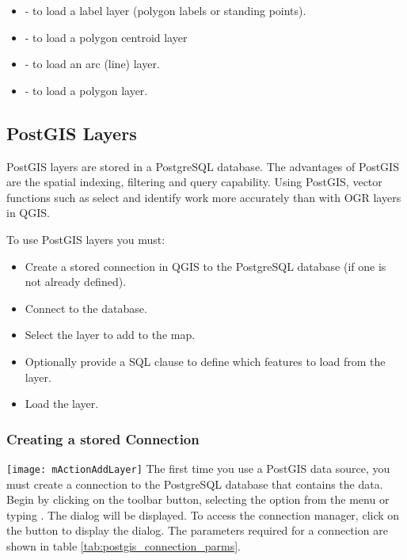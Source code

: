 \begin{itemize}
\item {} - to load a label layer (polygon labels or standing points).
\item {} - to load a polygon centroid layer 
\item {} - to load an arc (line) layer.
\item {} - to load a polygon layer.
\end{itemize}

\subsection{PostGIS Layers}
\label{label_postgis} 

PostGIS layers are stored in a PostgreSQL database. The advantages of PostGIS
are the spatial indexing, filtering and query capability. Using PostGIS,
vector functions such as select and identify work more accurately than with
OGR layers in QGIS.

To use PostGIS layers you must:

\begin{itemize}
\item Create a stored connection in QGIS to the PostgreSQL database (if one is
not already defined).
\item Connect to the database.
\item Select the layer to add to the map.
\item Optionally provide a SQL 
clause to define which features
to load from the layer.
\item Load the layer.
\end{itemize}

\subsubsection{Creating a stored
Connection}\label{sec:postgis_stored}

\texttt{[image: mActionAddLayer]} The first time
you use a PostGIS data source, you must create a connection to the PostgreSQL
database that contains the data. Begin by clicking on the
 toolbar button, selecting the
 option from the  menu or typing
. 
The  dialog will
be displayed. To access the connection manager, click on the  button to display the  dialog. The parameters required for a connection are shown
in table \ref{tab:postgis_connection_parms}.

